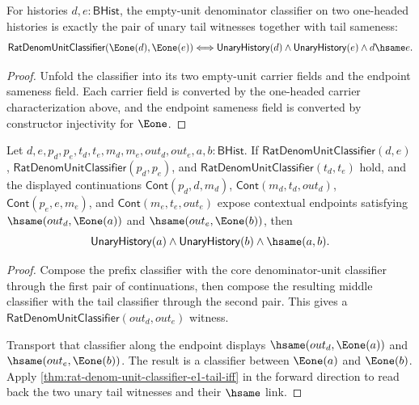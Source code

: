 \begin{theorem}
\label{thm:rat-denom-unit-classifier-e1-tail-iff}
For histories $d,e:\mathsf{BHist}$, the empty-unit denominator classifier on
two one-headed histories is exactly the pair of unary tail witnesses together
with tail sameness:
$$
\mathsf{RatDenomUnitClassifier}(\Eone(d),\Eone(e))
\Longleftrightarrow
\mathsf{UnaryHistory}(d)\wedge
\mathsf{UnaryHistory}(e)\wedge d\hsame e.
$$
\end{theorem}
\begin{proof}
Unfold the classifier into its two empty-unit carrier fields and the endpoint
sameness field. Each carrier field is converted by the one-headed carrier
characterization above, and the endpoint sameness field is converted by
constructor injectivity for $\Eone$.
\end{proof}

\begin{theorem}
\label{thm:rat-denom-unit-classifier-cont-context-e1-pair-readback}
Let $d,e,p_d,p_e,t_d,t_e,m_d,m_e,out_d,out_e,a,b:\mathsf{BHist}$. If
$\mathsf{RatDenomUnitClassifier}(d,e)$,
$\mathsf{RatDenomUnitClassifier}(p_d,p_e)$, and
$\mathsf{RatDenomUnitClassifier}(t_d,t_e)$ hold, and the displayed
continuations
$\mathsf{Cont}(p_d,d,m_d)$, $\mathsf{Cont}(m_d,t_d,out_d)$,
$\mathsf{Cont}(p_e,e,m_e)$, and $\mathsf{Cont}(m_e,t_e,out_e)$ expose
contextual endpoints satisfying $\hsame(out_d,\Eone(a))$ and
$\hsame(out_e,\Eone(b))$, then
$$
\mathsf{UnaryHistory}(a)\land\mathsf{UnaryHistory}(b)\land\hsame(a,b).
$$
\end{theorem}
\begin{proof}
Compose the prefix classifier with the core denominator-unit classifier through
the first pair of continuations, then compose the resulting middle classifier
with the tail classifier through the second pair. This gives a
$\mathsf{RatDenomUnitClassifier}(out_d,out_e)$ witness.

Transport that classifier along the endpoint displays
$\hsame(out_d,\Eone(a))$ and $\hsame(out_e,\Eone(b))$. The result is a
classifier between $\Eone(a)$ and $\Eone(b)$. Apply
\autoref{thm:rat-denom-unit-classifier-e1-tail-iff} in the forward direction
to read back the two unary tail witnesses and their $\hsame$ link.
\end{proof}

